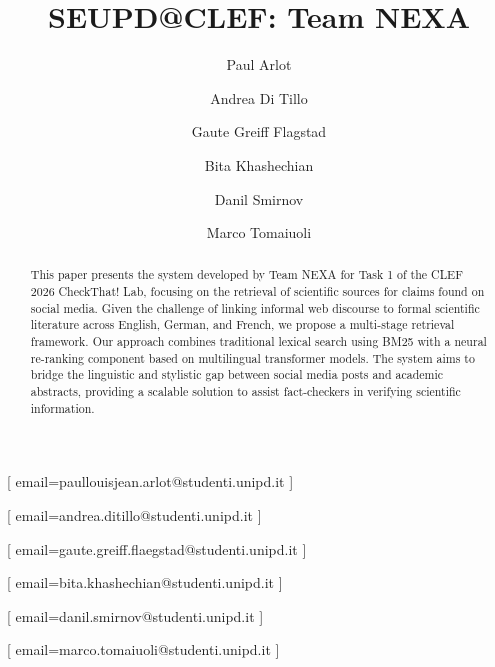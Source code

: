 \documentclass{ceurart}
\begin{document}


\title{SEUPD@CLEF: Team NEXA}

\author[1]{Paul Arlot}[
  email=paullouisjean.arlot@studenti.unipd.it
]

\author[1]{Andrea Di Tillo}[
  email=andrea.ditillo@studenti.unipd.it
]

\author[1]{Gaute Greiff Flagstad}[
  email=gaute.greiff.flaegstad@studenti.unipd.it
]

\author[1]{Bita Khashechian}[
  email=bita.khashechian@studenti.unipd.it
]

\author[1]{Danil Smirnov}[
  email=danil.smirnov@studenti.unipd.it
]

\author[1]{Marco Tomaiuoli}[
  email=marco.tomaiuoli@studenti.unipd.it
]

\address[1]{University of Padua, Italy}


\begin{abstract}
  This paper presents the system developed by Team NEXA for Task 1 of the CLEF 2026 CheckThat! Lab, focusing on the retrieval of scientific sources for claims found on social media. Given the challenge of linking informal web discourse to formal scientific literature across English, German, and French, we propose a multi-stage retrieval framework. Our approach combines traditional lexical search using BM25 with a neural re-ranking component based on multilingual transformer models. The system aims to bridge the linguistic and stylistic gap between social media posts and academic abstracts, providing a scalable solution to assist fact-checkers in verifying scientific information.
\end{abstract}
\end{document}
